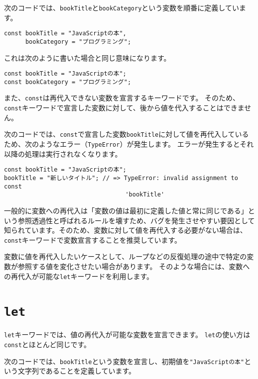 次のコードでは、\texttt{bookTitle}と\texttt{bookCategory}という変数を順番に定義しています。

\begin{lstlisting}
const bookTitle = "JavaScriptの本",
      bookCategory = "プログラミング";
\end{lstlisting}

これは次のように書いた場合と同じ意味になります。

\begin{lstlisting}
const bookTitle = "JavaScriptの本";
const bookCategory = "プログラミング";
\end{lstlisting}

また、\texttt{const}は再代入できない変数を宣言するキーワードです。
そのため、\texttt{const}キーワードで宣言した変数に対して、後から値を代入することはできません。

次のコードでは、\texttt{const}で宣言した変数\texttt{bookTitle}に対して値を再代入しているため、次のようなエラー（\texttt{TypeError}）が発生します。
エラーが発生するとそれ以降の処理は実行されなくなります。

\begin{lstlisting}
const bookTitle = "JavaScriptの本";
bookTitle = "新しいタイトル"; // => TypeError: invalid assignment to const
                                  'bookTitle'
\end{lstlisting}

一般的に変数への再代入は「変数の値は最初に定義した値と常に同じである」という参照透過性と呼ばれるルールを壊すため、バグを発生させやすい要因として知られています。そのため、変数に対して値を再代入する必要がない場合は、\texttt{const}キーワードで変数宣言することを推奨しています。

変数に値を再代入したいケースとして、ループなどの反復処理の途中で特定の変数が参照する値を変化させたい場合があります。
そのような場合には、変数への再代入が可能な\texttt{let}キーワードを利用します。

\hypertarget{let}{%
\section[\texttt{let}]{\texttt{let}\,\protect{}}\label{let}}

\texttt{let}キーワードでは、値の再代入が可能な変数を宣言できます。
\texttt{let}の使い方は\texttt{const}とほとんど同じです。

次のコードでは、\texttt{bookTitle}という変数を宣言し、初期値を\texttt{"JavaScriptの本"}という文字列であることを定義しています。

